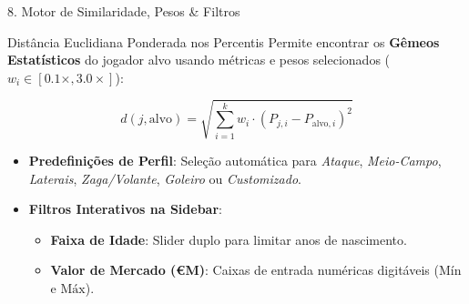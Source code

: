 \documentclass[aspectratio=169, 10pt]{beamer}
\begin{document}
\begin{frame}{8. Motor de Similaridade, Pesos \& Filtros}
  \begin{block}{Distância Euclidiana Ponderada nos Percentis}
    Permite encontrar os \textbf{Gêmeos Estatísticos} do jogador alvo usando métricas e pesos selecionados ($w_i \in [0.1\times, 3.0\times]$):
  \end{block}

  \begin{equation*}
    d(j, \text{alvo}) = \sqrt{\sum_{i=1}^{k} w_i \cdot \left( P_{j, i} - P_{\text{alvo}, i} \right)^2}
  \end{equation*}

  \begin{itemize}
    \item \textbf{Predefinições de Perfil}: Seleção automática para \textit{Ataque}, \textit{Meio-Campo}, \textit{Laterais}, \textit{Zaga/Volante}, \textit{Goleiro} ou \textit{Customizado}.
    \item \textbf{Filtros Interativos na Sidebar}:
      \begin{itemize}
        \item \textbf{Faixa de Idade}: Slider duplo para limitar anos de nascimento.
        \item \textbf{Valor de Mercado (€M)}: Caixas de entrada numéricas digitáveis ($\text{Mín}$ e $\text{Máx}$).
      \end{itemize}
  \end{itemize}
\end{frame}
\end{document}
